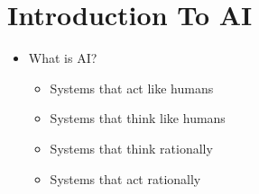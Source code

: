 %
%
%

\section{Introduction To AI}
\begin{itemize}
    \item What is AI\@?
        \begin{itemize}
            \item Systems that act like humans
            \item Systems that think like humans
            \item Systems that think rationally
            \item Systems that act rationally
        \end{itemize}
\end{itemize}
